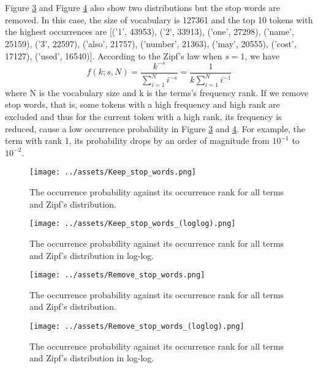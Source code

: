 \\\\
Figure \ref{fig:3} and Figure \ref{fig:4} also show two distributions but the stop words are removed. In this case, the size of vocabulary is 127361 and the top 10 tokens with the highest occurrences are [('1', 43953), ('2', 33913), ('one', 27298), ('name', 25159), ('3', 22597), ('also', 21757), ('number', 21363), ('may', 20555), ('cost', 17127), ('used', 16540)]. According to the Zipf's law when $s=1$, we have 
\begin{equation}
    f(k ; s, N)=\frac{k^{-s}}{\sum_{i=1}^N i^{-s}} = \frac{1}{k \sum_{i=1}^N i^{-1}}
\end{equation}
where N is the vocabulary size and k is the terms's frequency rank. If we remove 
stop words, that is, some tokens with a high frequency and high rank are excluded and thus for the current token with a high rank, its frequency is reduced, cause a low occurrence probability in Figure \ref{fig:3} and \ref{fig:4}. For example, the term with rank 1, its probability drops by an order of magnitude from $10^{-1}$ to $10^{-2}$.
\begin{figure}
    \centering
    \texttt{[image: ../assets/Keep\_stop\_words.png]}
    \caption{The occurrence probability against its occurrence rank for all terms and Zipf's distribution.}
    \label{fig:1}
  \end{figure}
  \begin{figure}
    \centering
    \texttt{[image: ../assets/Keep\_stop\_words\_(loglog).png]}
    \caption{The occurrence probability against its occurrence rank for all terms and Zipf's distribution in log-log.}
    \label{fig:2}
  \end{figure}
  \begin{figure}
    \centering
    \texttt{[image: ../assets/Remove\_stop\_words.png]}
    \caption{The occurrence probability against its occurrence rank for all terms and Zipf's distribution.}
    \label{fig:3}
  \end{figure}
  \begin{figure}
    \centering
    \texttt{[image: ../assets/Remove\_stop\_words\_(loglog).png]}
    \caption{The occurrence probability against its occurrence rank for all terms and Zipf's distribution in log-log.}
    \label{fig:4}
  \end{figure}
